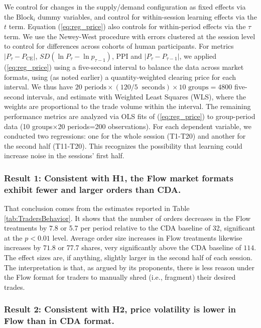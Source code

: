 \documentclass[12pt]{article}
\begin{document}
We control for changes in the supply/demand configuration as fixed effects via the $\text{Block}_i$ dummy variables,
and control for within-session learning effects via the $t$ term.
Equation (\ref{eq:reg_price}) also controls for within-period effects via the $\tau$ term. 
We use the Newey-West procedure with errors clustered at the session level to control for differences across cohorts of human participants.
For metrics $\lvert P_{\tau} - P_{\text{CE}}\rvert$, $SD\left(\ln P_{\tau} - \ln p_{{\tau} - 1}\right)$, PPI and $\lvert P_{{\tau}} - P_{{\tau} - 1}\rvert$, we applied (\ref{eq:reg_price}) using a five-second interval to balance the data across market formats, using (as noted earlier) a quantity-weighted clearing price for each interval. %
We thus have $20 \text{ periods} \times (120  / 5 \ \text{  seconds}) \times 10 \text{ groups}= 4800$ five-second intervals, and 
estimate with Weighted Least Squares (WLS), where the weights are proportional to the trade volume within the interval. 
The remaining performance metrics are analyzed via OLS fits of (\ref{eq:reg_price}) to group-period data (10 groups×20 periods=200 observations). 
For each dependent variable, we conducted two regressions: one for the whole session (T1-T20) and another for the second half (T11-T20). 
This recognizes the possibility that learning could increase noise in the sessions' first half. 


\subsubsection*{Result 1: 
Consistent with H1, the Flow market formats exhibit fewer and larger orders than CDA.}

That conclusion comes from the estimates reported in Table \ref{tab:TradersBehavior}.
It shows that the number of orders decreases in the Flow treatments by $7.8$ or 5.7 per period relative to the CDA baseline of 32, significant at the $p<0.01$ level. 
Average order size increases in Flow treatments likewise increases by $71.8$ or 77.7 shares, very significantly above the CDA baseline of $114$. 
The effect sizes are, if anything, slightly larger in the second half of each session. 
The interpretation is that, as argued by its proponents, there is less reason under the Flow format for traders to manually shred (i.e., fragment) their desired trades.

\subsubsection*{Result 2: Consistent with H2, price volatility is lower in Flow than in CDA format.}
\end{document}
